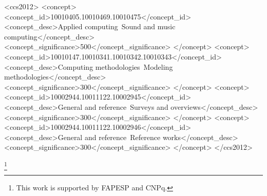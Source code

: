 \documentclass[format=acmsmall, review=true, screen=true]{acmart}
\begin{document}
%
%
\begin{CCSXML}
  <ccs2012>
    <concept>
      <concept_id>10010405.10010469.10010475</concept_id>
      <concept_desc>Applied computing~Sound and music computing</concept_desc>
      <concept_significance>500</concept_significance>
    </concept>
    <concept>
      <concept_id>10010147.10010341.10010342.10010343</concept_id>
      <concept_desc>Computing methodologies~Modeling methodologies</concept_desc>
      <concept_significance>300</concept_significance>
    </concept>
    <concept>
      <concept_id>10002944.10011122.10002945</concept_id>
      <concept_desc>General and reference~Surveys and overviews</concept_desc>
      <concept_significance>300</concept_significance>
    </concept>
    <concept>
      <concept_id>10002944.10011122.10002946</concept_id>
      <concept_desc>General and reference~Reference works</concept_desc>
      <concept_significance>300</concept_significance>
    </concept>
  </ccs2012>
\end{CCSXML}


%
%




\thanks{This work is supported by FAPESP and CNPq.}


\maketitle


\end{document}
